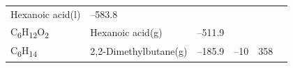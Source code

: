 \documentclass[
  9pt,
]{extbook}
\theoremstyle{definition}
\theoremstyle{definition}
\theoremstyle{definition}
\theoremstyle{remark}
\begin{document}
\begin{longtable}[]{@{}llllll@{}}
\begin{minipage}[t]{0.17\columnwidth}
Hexanoic acid(l)\strut
\end{minipage} & \begin{minipage}[t]{0.15\columnwidth}\raggedright
--583.8\strut
\end{minipage} & \begin{minipage}[t]{0.15\columnwidth}\raggedright
\strut
\end{minipage} & \begin{minipage}[t]{0.14\columnwidth}\raggedright
\strut
\end{minipage} & \begin{minipage}[t]{0.14\columnwidth}\raggedright
\strut
\end{minipage}\tabularnewline
\begin{minipage}[t]{0.07\columnwidth}\raggedright
C\textsubscript{6}H\textsubscript{12}O\textsubscript{2}\strut
\end{minipage} & \begin{minipage}[t]{0.17\columnwidth}\raggedright
Hexanoic acid(g)\strut
\end{minipage} & \begin{minipage}[t]{0.15\columnwidth}\raggedright
--511.9\strut
\end{minipage} & \begin{minipage}[t]{0.15\columnwidth}\raggedright
\strut
\end{minipage} & \begin{minipage}[t]{0.14\columnwidth}\raggedright
\strut
\end{minipage} & \begin{minipage}[t]{0.14\columnwidth}\raggedright
\strut
\end{minipage}\tabularnewline
\begin{minipage}[t]{0.07\columnwidth}\raggedright
C\textsubscript{6}H\textsubscript{14}\strut
\end{minipage} & \begin{minipage}[t]{0.17\columnwidth}\raggedright
2,2-Dimethylbutane(g)\strut
\end{minipage} & \begin{minipage}[t]{0.15\columnwidth}\raggedright
--185.9\strut
\end{minipage} & \begin{minipage}[t]{0.15\columnwidth}\raggedright
--10\strut
\end{minipage} & \begin{minipage}[t]{0.14\columnwidth}\raggedright
358\strut
\end{minipage} & \begin{minipage}[t]{0.14\columnwidth}\raggedright

\end{minipage}
\end{longtable}
\end{document}

